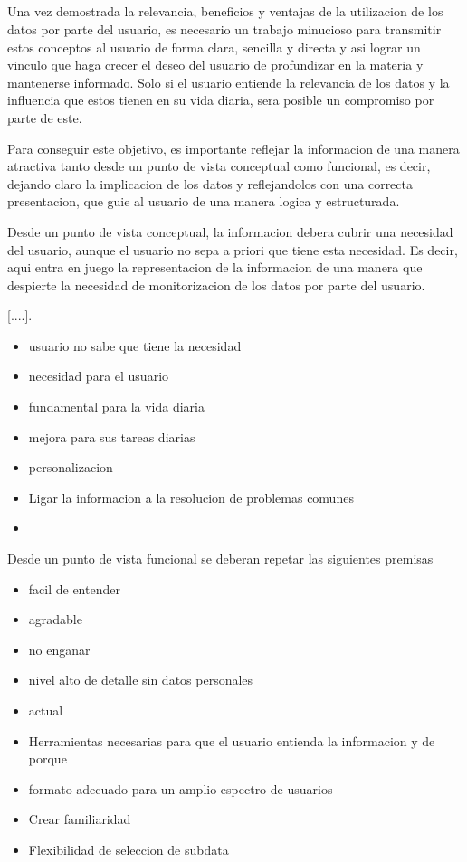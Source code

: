 \subsection*{}
Una vez demostrada la relevancia, beneficios y ventajas de la utilizacion de los datos por parte del usuario, es necesario un trabajo minucioso para
transmitir estos conceptos al usuario de forma clara, sencilla y directa y asi lograr un vinculo que haga crecer el deseo del usuario de profundizar en la materia y
mantenerse informado. 
Solo si el usuario entiende la relevancia de los datos y la influencia que estos tienen en su vida diaria, sera posible un compromiso por parte de este.

Para conseguir este objetivo, es importante reflejar la informacion de una manera atractiva tanto desde un punto de vista conceptual como funcional, 
es decir, dejando claro la implicacion de los datos y reflejandolos con una correcta presentacion, que guie al usuario de una manera logica y estructurada.

Desde un punto de vista conceptual, la informacion debera cubrir una necesidad del usuario, aunque el usuario no sepa a priori que tiene esta necesidad.
Es decir, aqui entra en juego la representacion de la informacion de una manera que despierte la necesidad de monitorizacion de los datos por parte
del usuario.

[....].
\begin{itemize}

\item usuario no sabe que tiene la necesidad
\item necesidad para el usuario
\item fundamental para la vida diaria
\item mejora para sus tareas diarias
\item personalizacion
\item Ligar la informacion a la resolucion de problemas comunes
\item \end{itemize}

Desde un punto de vista funcional se deberan repetar las siguientes premisas

\begin{itemize}
\item facil de entender
\item agradable
\item no enganar
\item nivel alto de detalle sin datos personales
\item actual
\item Herramientas necesarias para que el usuario entienda la informacion y de porque
\item formato adecuado para un amplio espectro de usuarios
\item Crear familiaridad
\item Flexibilidad de seleccion de subdata
  \end{itemize}